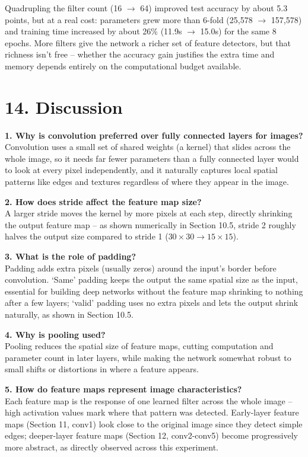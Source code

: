 \documentclass[11pt]{article}
\begin{document}
Quadrupling the filter count (16 $\to$ 64) improved test accuracy by about 5.3 points, but at a real cost: parameters grew more than 6-fold (25,578 $\to$ 157,578) and training time increased by about 26\% (11.9s $\to$ 15.0s) for the same 8 epochs. More filters give the network a richer set of feature detectors, but that richness isn't free -- whether the accuracy gain justifies the extra time and memory depends entirely on the computational budget available.


\section*{14. Discussion}

\textbf{1. Why is convolution preferred over fully connected layers for images?}\\
Convolution uses a small set of shared weights (a kernel) that slides across the whole image, so it needs far fewer parameters than a fully connected layer would to look at every pixel independently, and it naturally captures local spatial patterns like edges and textures regardless of where they appear in the image.

\textbf{2. How does stride affect the feature map size?}\\
A larger stride moves the kernel by more pixels at each step, directly shrinking the output feature map -- as shown numerically in Section 10.5, stride 2 roughly halves the output size compared to stride 1 ($30\times30 \to 15\times15$).

\textbf{3. What is the role of padding?}\\
Padding adds extra pixels (usually zeros) around the input's border before convolution. `Same' padding keeps the output the same spatial size as the input, essential for building deep networks without the feature map shrinking to nothing after a few layers; `valid' padding uses no extra pixels and lets the output shrink naturally, as shown in Section 10.5.

\textbf{4. Why is pooling used?}\\
Pooling reduces the spatial size of feature maps, cutting computation and parameter count in later layers, while making the network somewhat robust to small shifts or distortions in where a feature appears.

\textbf{5. How do feature maps represent image characteristics?}\\
Each feature map is the response of one learned filter across the whole image -- high activation values mark where that pattern was detected. Early-layer feature maps (Section 11, conv1) look close to the original image since they detect simple edges; deeper-layer feature maps (Section 12, conv2-conv5) become progressively more abstract, as directly observed across this experiment.
\end{document}
